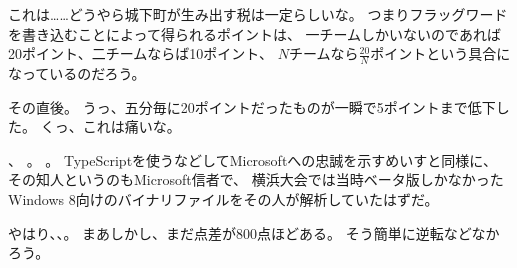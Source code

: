 これは……どうやら城下町が生み出す税は一定らしいな。
つまりフラッグワードを書き込むことによって得られるポイントは、
一チームしかいないのであれば20ポイント、二チームならば10ポイント、
$N$チームなら$\frac{20}{N}$ポイントという具合になっているのだろう。

その直後。
うっ、五分毎に20ポイントだったものが一瞬で5ポイントまで低下した。
くっ、これは痛いな。

、
。
。
TypeScriptを使うなどしてMicrosoftへの忠誠を示すめいすと同様に、
その知人というのもMicrosoft信者で、
横浜大会では当時ベータ版しかなかったWindows 8向けのバイナリファイルをその人が解析していたはずだ。

やはり\wasamusume、\MMA、。
まあしかし、まだ点差が800点ほどある。
そう簡単に逆転などなかろう。
